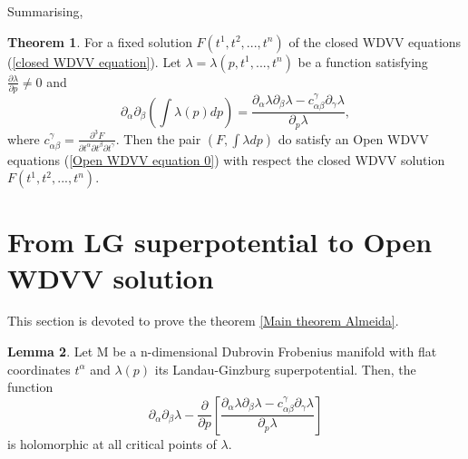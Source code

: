 \documentclass{article}
\theoremstyle{definition}
\newtheorem{theorem}{Theorem}[section]
\newtheorem{lemma}[theorem]{Lemma}
\begin{document}
Summarising, 




\begin{theorem}\cite{Alcolado Adam}
For a fixed solution $F(t^1, t^2, ..., t^n)$ of the closed WDVV equations (\ref{closed WDVV equation}). Let $\lambda= \lambda(p,t^1, . . . , t^n)$ be a function satisfying $\frac{\partial \lambda}{\partial p}\neq  0$ and
 \begin{equation}\label{Adam identity 1 equation}
\partial_{\alpha}\partial_{\beta}\left(\int \lambda(p)dp\right)= \frac{ \partial_{\alpha}\lambda \partial_{\beta}\lambda-c_{\alpha\beta}^{\gamma}\partial_{\gamma}\lambda}{ \partial_{p}\lambda},
\end{equation}
where $c_{\alpha\beta}^{\gamma}=\frac{\partial^3 F}{\partial t^{\alpha}\partial t^{\beta}\partial t^{\gamma}}$.
Then the pair $(F,\int\lambda dp)$ do satisfy an Open WDVV equations (\ref{Open WDVV equation 0}) with respect the closed WDVV solution $F(t^1, t^2, ..., t^n)$.


\end{theorem}



\section{From LG superpotential  to Open WDVV solution}


This section is devoted to prove the theorem \ref{Main theorem Almeida}.


\begin{lemma}\label{Auxiliar lemma Generalized Adam Id 1}
 Let M be a n-dimensional Dubrovin Frobenius manifold with flat coordinates $t^{\alpha}$  and $\lambda(p)$ its Landau-Ginzburg superpotential. Then, the function 
 \begin{equation}\label{Bounded rhs of Adam id}
\partial_{\alpha}\partial_{\beta}\lambda-\frac{\partial}{\partial p}\left[ \frac{ \partial_{\alpha}\lambda \partial_{\beta}\lambda-c_{\alpha\beta}^{\gamma}\partial_{\gamma}\lambda}{ \partial_{p}\lambda}  \right]
\end{equation}
is holomorphic at all critical points of $\lambda$.

\end{lemma}
\end{document}
